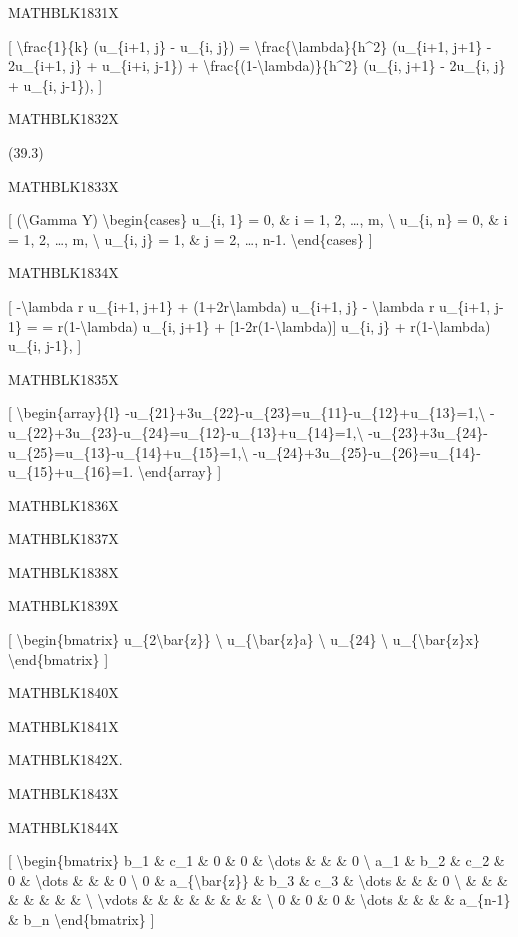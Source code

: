 \documentclass[
]{article}
\begin{document}
MATHBLK1831X

{[} \textbackslash frac\{1\}\{k\} (u\_\{i+1, j\} - u\_\{i, j\}) =
\textbackslash frac\{\textbackslash lambda\}\{h\^{}2\} (u\_\{i+1, j+1\}
- 2u\_\{i+1, j\} + u\_\{i+i, j-1\}) +
\textbackslash frac\{(1-\textbackslash lambda)\}\{h\^{}2\} (u\_\{i,
j+1\} - 2u\_\{i, j\} + u\_\{i, j-1\}), {]}

MATHBLK1832X

(39.3)

MATHBLK1833X

{[} (\textbackslash Gamma Y) \textbackslash begin\{cases\} u\_\{i, 1\} =
0, \& i = 1, 2, \ldots, m, \textbackslash{} u\_\{i, n\} = 0, \& i = 1,
2, \ldots, m, \textbackslash{} u\_\{i, j\} = 1, \& j = 2, \ldots, n-1.
\textbackslash end\{cases\} {]}

MATHBLK1834X

{[} -\textbackslash lambda r u\_\{i+1, j+1\} +
(1+2r\textbackslash lambda) u\_\{i+1, j\} - \textbackslash lambda r
u\_\{i+1, j-1\} = = r(1-\textbackslash lambda) u\_\{i, j+1\} +
{[}1-2r(1-\textbackslash lambda){]} u\_\{i, j\} +
r(1-\textbackslash lambda) u\_\{i, j-1\}, {]}

MATHBLK1835X

{[} \textbackslash begin\{array\}\{l\}
-u\_\{21\}+3u\_\{22\}-u\_\{23\}=u\_\{11\}-u\_\{12\}+u\_\{13\}=1,\textbackslash{}
-u\_\{22\}+3u\_\{23\}-u\_\{24\}=u\_\{12\}-u\_\{13\}+u\_\{14\}=1,\textbackslash{}
-u\_\{23\}+3u\_\{24\}-u\_\{25\}=u\_\{13\}-u\_\{14\}+u\_\{15\}=1,\textbackslash{}
-u\_\{24\}+3u\_\{25\}-u\_\{26\}=u\_\{14\}-u\_\{15\}+u\_\{16\}=1.
\textbackslash end\{array\} {]}

MATHBLK1836X

MATHBLK1837X

MATHBLK1838X

MATHBLK1839X

{[} \textbackslash begin\{bmatrix\} u\_\{2\textbackslash bar\{z\}\}
\textbackslash{} u\_\{\textbackslash bar\{z\}a\} \textbackslash{}
u\_\{24\} \textbackslash{} u\_\{\textbackslash bar\{z\}x\}
\textbackslash end\{bmatrix\} {]}

MATHBLK1840X

MATHBLK1841X

MATHBLK1842X.

MATHBLK1843X

MATHBLK1844X

{[} \textbackslash begin\{bmatrix\} b\_1 \& c\_1 \& 0 \& 0 \&
\textbackslash dots \& \& \& 0 \textbackslash{} a\_1 \& b\_2 \& c\_2 \&
0 \& \textbackslash dots \& \& \& 0 \textbackslash{} 0 \&
a\_\{\textbackslash bar\{z\}\} \& b\_3 \& c\_3 \& \textbackslash dots \&
\& \& 0 \textbackslash{} \& \& \& \& \& \& \& \& \textbackslash{}
\textbackslash vdots \& \& \& \& \& \& \& \& \textbackslash{} 0 \& 0 \&
0 \& \textbackslash dots \& \& \& \& a\_\{n-1\} \& b\_n
\textbackslash end\{bmatrix\} {]}
\end{document}
